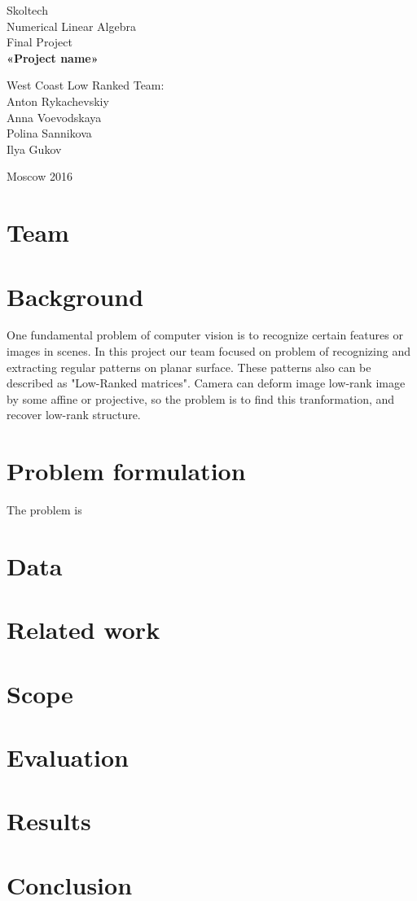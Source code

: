 \documentclass[12pt,a4paper]{article}
\begin{document}
	\begin{titlepage}
		\begin{center}
			\small
			Skoltech \\
			\vspace{10cm} 
			Numerical Linear Algebra\\
			Final Project\\
			\textbf{
				\large
				«Project name»}
		\end{center}
		\vspace{8.5cm} 
		\small	
		\begin{flushright}
			West Coast Low Ranked Team:\\
			Anton Rykachevskiy\\
			Anna Voevodskaya\\
			Polina Sannikova\\
			Ilya Gukov\\
			
		\end{flushright}
		\vspace{\fill}
		
		\begin{center}
			Moscow 2016
		\end{center}
	\end{titlepage}
	
	\newpage
	
	\tableofcontents
	\newpage
	\section{Team}
	\section{Background}
	One fundamental problem of computer vision is to recognize certain features or images in scenes. In this project our team focused on problem of recognizing and extracting regular patterns on planar surface. These patterns also can be described as "Low-Ranked matrices". Camera can deform image low-rank image by some affine or projective, so the problem is to find this tranformation, and recover low-rank structure.  
	\section{Problem formulation}
	The problem is 
	\section{Data}
	\section{Related work}
	\section{Scope}
	\section{Evaluation}
	\section{Results}
	\section{Conclusion}
	\clearpage
	\begin{thebibliography}{99}
		
		\end{thebibliography}
\end{document}
